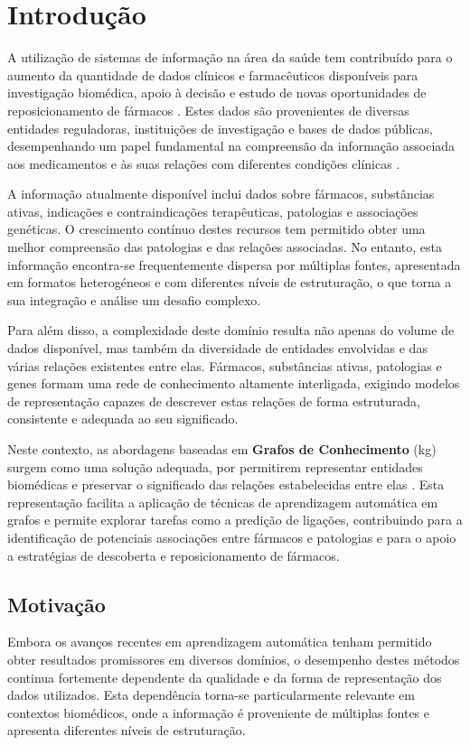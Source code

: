 % 
%  
%
\chapter{Introdução}
\label{cha:introdução}
A utilização de sistemas de informação na área da saúde tem contribuído para o aumento da quantidade de dados clínicos e farmacêuticos disponíveis para investigação biomédica, apoio à decisão e estudo de novas oportunidades de reposicionamento de fármacos \cite{raghupathi2014bigdata}. Estes dados são provenientes de diversas entidades reguladoras, instituições de investigação e bases de dados públicas, desempenhando um papel fundamental na compreensão da informação associada aos medicamentos e às suas relações com diferentes condições clínicas \cite{jensen2012mining}.

A informação atualmente disponível inclui dados sobre fármacos, substâncias ativas, indicações e contraindicações terapêuticas, patologias e associações genéticas. O crescimento contínuo destes recursos tem permitido obter uma melhor compreensão das patologias e das relações associadas. No entanto, esta informação encontra-se frequentemente dispersa por múltiplas fontes, apresentada em formatos heterogéneos e com diferentes níveis de estruturação, o que torna a sua integração e análise um desafio complexo.

Para além disso, a complexidade deste domínio resulta não apenas do volume de dados disponível, mas também da diversidade de entidades envolvidas e das várias relações existentes entre elas. Fármacos, substâncias ativas, patologias e genes formam uma rede de conhecimento altamente interligada, exigindo modelos de representação capazes de descrever estas relações de forma estruturada, consistente e adequada ao seu significado.

Neste contexto, as abordagens baseadas em \textbf{Grafos de Conhecimento} (\acrfull{kg}) surgem como uma solução adequada, por permitirem representar entidades biomédicas e preservar o significado das relações estabelecidas entre elas \cite{ghazvinian2019knowledgegraphs}. Esta representação facilita a aplicação de técnicas de aprendizagem automática em grafos e permite explorar tarefas como a predição de ligações, contribuindo para a identificação de potenciais associações entre fármacos e patologias e para o apoio a estratégias de descoberta e reposicionamento de fármacos.

\section{Motivação}
\label{sec:motivação}
Embora os avanços recentes em aprendizagem automática tenham permitido obter resultados promissores em diversos domínios, o desempenho destes métodos continua fortemente dependente da qualidade e da forma de representação dos dados utilizados. Esta dependência torna-se particularmente relevante em contextos biomédicos, onde a informação é proveniente de múltiplas fontes e apresenta diferentes níveis de estruturação.

